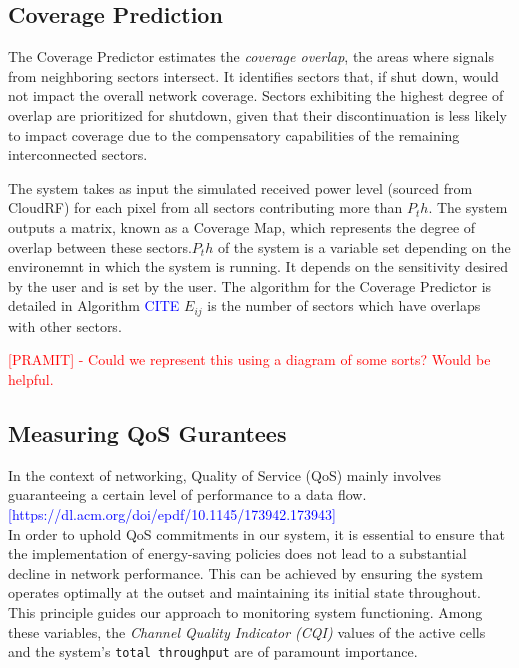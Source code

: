 \subsection{Coverage Prediction}



The Coverage Predictor estimates the \textit{coverage overlap}, the areas where signals from neighboring sectors intersect. 
It identifies sectors that, if shut down, would not impact the overall network coverage. 
Sectors exhibiting the highest degree of overlap are prioritized for shutdown, given that their discontinuation is less likely to impact coverage due to the compensatory capabilities of the remaining interconnected sectors.

The system takes as input the simulated received power level (sourced from CloudRF) for each pixel from all sectors contributing more than $P_th$. 
The system outputs a matrix, known as a Coverage Map, which represents the degree of overlap between these sectors.$P_th$ of the system is a variable set depending on the environemnt in which the system is running. 
It depends on the sensitivity desired by the user and is set by the user.
The algorithm for the Coverage Predictor is detailed in Algorithm \textcolor{blue}{CITE} %
$E_{ij}$ is the number of sectors which have overlaps with other sectors.

\textcolor{red}{[PRAMIT] - Could we represent this using a diagram of some sorts? Would be helpful.\\}

\subsection{Measuring  QoS Gurantees}


In the context of networking, Quality of Service (QoS) mainly involves guaranteeing a certain level of performance to a data flow. \textcolor{blue}{[https://dl.acm.org/doi/epdf/10.1145/173942.173943]} \\
In order to uphold QoS commitments in our system, it is essential to ensure that the implementation of energy-saving policies does not lead to a substantial decline in network performance.
This can be achieved by ensuring the system operates optimally at the outset and maintaining its initial state throughout. This principle guides our approach to monitoring system functioning.
Among these variables, the \textit{Channel Quality Indicator (CQI)} values of the active cells and the system's \texttt{total throughput} are of paramount importance.

